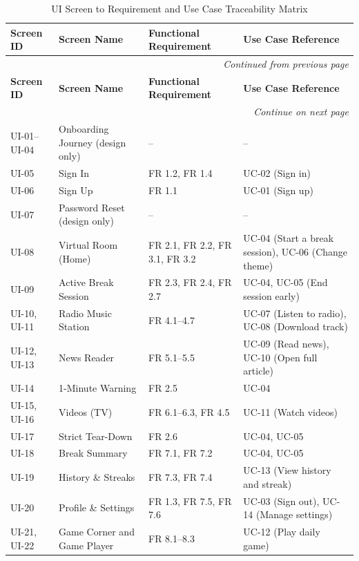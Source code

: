\begin{longtable}{|p{2.2cm}|p{3.5cm}|p{3.8cm}|p{4.5cm}|}
\caption{UI Screen to Requirement and Use Case Traceability Matrix}
\label{tab:ui-traceability}\\
\hline
\textbf{Screen ID} & \textbf{Screen Name} & \textbf{Functional Requirement} & \textbf{Use Case Reference} \\
\hline
\endfirsthead
\multicolumn{4}{r}{\textit{Continued from previous page}}\\[-2pt]\hline
\textbf{Screen ID} & \textbf{Screen Name} & \textbf{Functional Requirement} & \textbf{Use Case Reference} \\
\hline
\endhead
\multicolumn{4}{r}{\textit{Continue on next page}}\\
\endfoot
\endlastfoot

UI-01--UI-04 & Onboarding Journey (design only) & -- & -- \\ \hline
UI-05 & Sign In & FR 1.2, FR 1.4 & UC-02 (Sign in) \\ \hline
UI-06 & Sign Up & FR 1.1 & UC-01 (Sign up) \\ \hline
UI-07 & Password Reset (design only) & -- & -- \\ \hline
UI-08 & Virtual Room (Home) & FR 2.1, FR 2.2, FR 3.1, FR 3.2 & UC-04 (Start a break session), UC-06 (Change theme) \\ \hline
UI-09 & Active Break Session & FR 2.3, FR 2.4, FR 2.7 & UC-04, UC-05 (End session early) \\ \hline
UI-10, UI-11 & Radio Music Station & FR 4.1--4.7 & UC-07 (Listen to radio), UC-08 (Download track) \\ \hline
UI-12, UI-13 & News Reader & FR 5.1--5.5 & UC-09 (Read news), UC-10 (Open full article) \\ \hline
UI-14 & 1-Minute Warning & FR 2.5 & UC-04 \\ \hline
UI-15, UI-16 & Videos (TV) & FR 6.1--6.3, FR 4.5 & UC-11 (Watch videos) \\ \hline
UI-17 & Strict Tear-Down & FR 2.6 & UC-04, UC-05 \\ \hline
UI-18 & Break Summary & FR 7.1, FR 7.2 & UC-04, UC-05 \\ \hline
UI-19 & History \& Streaks & FR 7.3, FR 7.4 & UC-13 (View history and streak) \\ \hline
UI-20 & Profile \& Settings & FR 1.3, FR 7.5, FR 7.6 & UC-03 (Sign out), UC-14 (Manage settings) \\ \hline
UI-21, UI-22 & Game Corner and Game Player & FR 8.1--8.3 & UC-12 (Play daily game) \\ \hline
\end{longtable}
